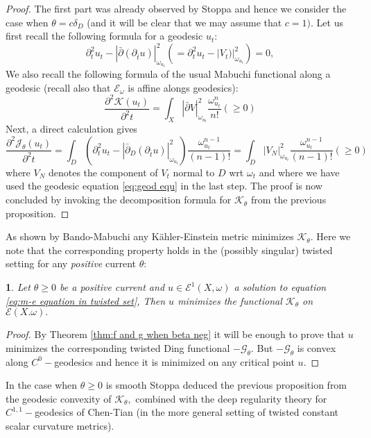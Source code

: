 \documentclass[11pt,oneside,english]{amsart}
\numberwithin{equation}{section}
\numberwithin{figure}{section}
\theoremstyle{plain}
\theoremstyle{plain}
\theoremstyle{plain}
\theoremstyle{plain}
\newtheorem{prop}[thm]{\protect\propositionname}
\theoremstyle{remark}
\theoremstyle{definition}
\providecommand{\propositionname}{Proposition}
\begin{document}
\begin{proof}
The first part was already observed by Stoppa \cite{st} and hence
we consider the case when $\theta=c\delta_{D}$ (and it will be clear
that we may assume that $c=1).$ Let us first recall the following
formula for a geodesic $u_{t}:$ 
\begin{equation}
\partial_{t}^{2}u_{t}-|\bar{\partial}(\partial_{\bar{t}}u)|_{\omega_{u_{t}}}^{2}(=\partial_{t}^{2}u_{t}-|V_{t})|_{\omega_{u_{t}}}^{2})=0,\label{eq:geod equ}
\end{equation}
 We also recall the following formula \cite{m1,d00} of the usual
Mabuchi functional along a geodesic (recall also that $\mathcal{E}_{\omega}$
is affine alongs geodesics): 
\[
\frac{\partial^{2}\mathcal{K}(u_{t})}{\partial^{2}t}=\int_{X}|\bar{\partial}V|_{\omega_{u_{t}}}^{2}\frac{\omega_{u_{t}}^{n}}{n!}(\geq0)
\]
 Next, a direct calculation gives 
\[
\frac{\partial^{2}\mathcal{J}_{\theta}(u_{t})}{\partial^{2}t}=\int_{D}(\partial_{t}^{2}u_{t}-|\bar{\partial}_{D}(\partial_{\bar{t}}u)|_{\omega_{u_{t}}}^{2})\frac{\omega_{u_{t}}^{n-1}}{(n-1)!}=\int_{D}|V_{N}|_{\omega_{u_{t}}}^{2}\frac{\omega_{u_{t}}^{n-1}}{(n-1)!}(\geq0)
\]
 where $V_{N}$ denotes the component of $V_{t}$ normal to $D$ wrt
$\omega_{t}$ and where we have used the geodesic equation \ref{eq:geod equ}
in the last step. The proof is now concluded by invoking the decomposition
formula for $\mathcal{K}_{\theta}$ from the previous proposition. 
\end{proof}
As shown by Bando-Mabuchi \cite{b-m} any Kähler-Einstein metric minimizes
$\mathcal{K}_{\theta}.$ Here we note that the corresponding property
holds in the (possibly singular) twisted setting for any \emph{positive}
current $\theta:$ 
\begin{prop}
\label{pro:minim of k-ene for pos theta}Let $\theta\geq0$ be a positive
current and $u\in\mathcal{E}^{1}(X,\omega)$ a solution to equation
\ref{eq:m-e equation in twisted set}, Then $u$ minimizes the functional
$\mathcal{K}_{\theta}$ on $\mathcal{E}(X.\omega).$ \end{prop}
\begin{proof}
By Theorem \ref{thm:f and g when beta neg} it will be enough to prove
that $u$ minimizes the corresponding twisted Ding functional $-\mathcal{G}_{\theta}.$
But $-\mathcal{G}_{\theta}$ is convex along $C^{0}-$geodesics \cite{bern}
and hence it is minimized on any critical point $u.$ 
\end{proof}
In the case when $\theta\geq0$ is smooth Stoppa \cite{st} deduced
the previous proposition from the geodesic convexity of $\mathcal{K}_{\theta},$
combined with the deep regularity theory for $C^{1,1}-$geodesics
of Chen-Tian (in the more general setting of twisted constant scalar
curvature metrics).
\end{document}
